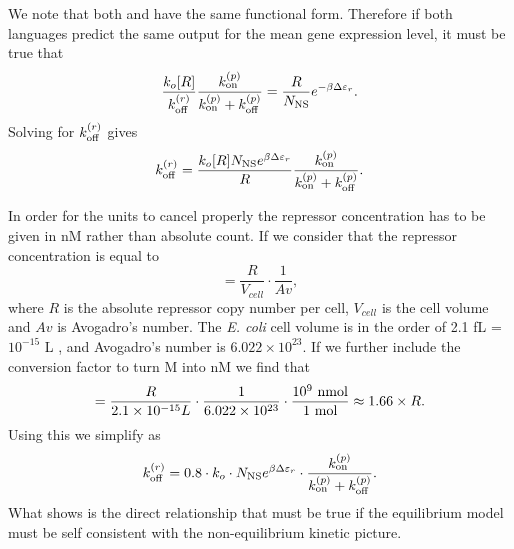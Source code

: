 We note that both  and  have the same
functional form. Therefore if both languages predict the same output for the
mean gene expression level, it must be true that
\begin{equation}
  {k_o [R] \over k^{(r)}_{\text{off}}}{k^{(p)}_{\text{on}}\over k^{(p)}_{\text{on}}+ k^{(p)}_{\text{off}}} =
  {R \over N_\text{NS}} e^{-\beta\Delta\varepsilon_r}.
\end{equation}
Solving for $k^{(r)}_{\text{off}}$ gives
\begin{equation}
  k^{(r)}_{\text{off}} = {k_o [R] N_\text{NS} e^{\beta\Delta\varepsilon_r} \over R}{k^{(p)}_{\text{on}} \over k^{(p)}_{\text{on}} + k^{(p)}_{\text{off}}}.
  \label{eq_kroff_complete}
\end{equation}

In order for the units to cancel properly the repressor concentration has to be
given in nM rather than absolute count. If we consider that the repressor
concentration is equal to
\begin{equation}
[R] = \frac{R}{V_{cell}}\cdot \frac{1}{Av},
\end{equation}
where $R$ is the absolute repressor copy number per cell, $V_{cell}$ is the cell
volume and $Av$ is Avogadro's number. The \textit{E. coli} cell volume is in the
order of 2.1 fL = $10^{-15}$ L , and Avogadro's
number is $6.022 \times 10^{23}$. If we further include the conversion factor to
turn M into nM we find that
\begin{equation}
[R] = {R \over 2.1 \times 10^{-15} L} \cdot {1 \over 6.022 \times 10^{23}}
\cdot {10^9 \text{ nmol} \over 1 \text{ mol}} \approx 1.66 \times R.
\end{equation}
Using this we simplify  as
\begin{equation}
  k^{(r)}_{\text{off}} = 0.8 \cdot k_o \cdot N_\text{NS} e^{\beta\Delta\varepsilon_r}
   \cdot {k^{(p)}_{\text{on}}\over k^{(p)}_{\text{on}}+ k^{(p)}_{\text{off}}}.
  \label{eq_kroff}
\end{equation}
What  shows is the direct relationship that must be true if the
equilibrium model must be self consistent with the non-equilibrium kinetic
picture.
